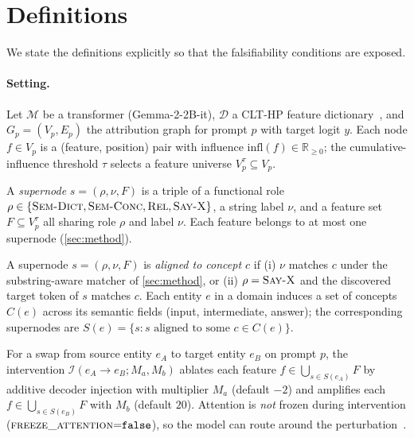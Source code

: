 \section{Definitions}
\label{sec:definitions}

We state the definitions explicitly so that the falsifiability conditions are exposed.

\paragraph{Setting.}
Let $\mathcal{M}$ be a transformer (Gemma-2-2B-it), $\mathcal{D}$ a CLT-HP feature dictionary~\cite{hanna2025clthp,ameisen2025circuittracing}, and $G_p = (V_p, E_p)$ the attribution graph for prompt $p$ with target logit $y$. Each node $f \in V_p$ is a (feature, position) pair with influence $\mathrm{infl}(f) \in \mathbb{R}_{\geq 0}$; the cumulative-influence threshold $\tau$ selects a feature universe $V_p^{\tau} \subseteq V_p$.

\begin{definition}[Supernode]
\label{def:supernode}
A \emph{supernode} $s = (\rho, \nu, F)$ is a triple of a functional role $\rho \in \{\textsc{Sem-Dict}, \textsc{Sem-Conc}, \textsc{Rel}, \textsc{Say-X}\}$, a string label $\nu$, and a feature set $F \subseteq V_p^{\tau}$ all sharing role $\rho$ and label $\nu$. Each feature belongs to at most one supernode (\cref{sec:method}).
\end{definition}

\begin{definition}
\label{def:aligned}
A supernode $s = (\rho, \nu, F)$ is \emph{aligned to concept $c$} if (i) $\nu$ matches $c$ under the substring-aware matcher of \cref{sec:method}, or (ii) $\rho = \textsc{Say-X}$ and the discovered target token of $s$ matches $c$. Each entity $e$ in a domain induces a set of concepts $C(e)$ across its semantic fields (input, intermediate, answer); the corresponding supernodes are $S(e) = \{s : s \text{ aligned to some } c \in C(e)\}$.
\end{definition}

\begin{definition}
\label{def:swap}
For a swap from source entity $e_A$ to target entity $e_B$ on prompt $p$, the intervention $\mathcal{I}(e_A \to e_B; M_a, M_b)$ ablates each feature $f \in \bigcup_{s \in S(e_A)} F$ by additive decoder injection with multiplier $M_a$ (default $-2$) and amplifies each $f \in \bigcup_{s \in S(e_B)} F$ with $M_b$ (default $20$). Attention is \emph{not} frozen during intervention ($\textsc{freeze\_attention}{=}\texttt{false}$), so the model can route around the perturbation~\cite{ameisen2025circuittracing}.
\end{definition}

